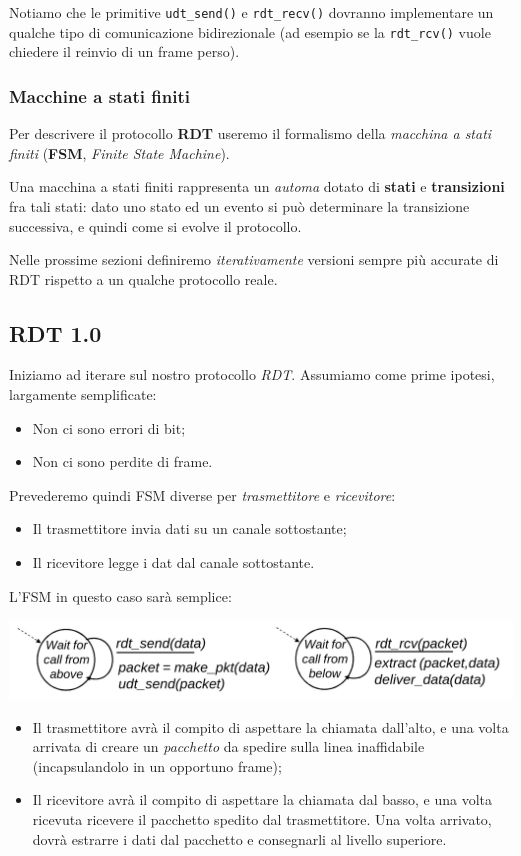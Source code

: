 \documentclass[a4paper,11pt]{article}
\begin{document}
Notiamo che le primitive \lstinline|udt_send()| e \lstinline|rdt_recv()| dovranno implementare un qualche tipo di comunicazione bidirezionale (ad esempio se la \lstinline|rdt_rcv()| vuole chiedere il reinvio di un frame perso).

\subsubsection{Macchine a stati finiti}
Per descrivere il protocollo \textbf{RDT} useremo il formalismo della \textit{macchina a stati finiti} (\textbf{FSM}, \textit{Finite State Machine}).

Una macchina a stati finiti rappresenta un \textit{automa} dotato di \textbf{stati} e \textbf{transizioni} fra tali stati: dato uno stato ed un evento si può determinare la transizione successiva, e quindi come si evolve il protocollo. 

\par\smallskip

Nelle prossime sezioni definiremo \textit{iterativamente} versioni sempre più accurate di RDT rispetto a un qualche protocollo reale.

\subsection{RDT 1.0}
Iniziamo ad iterare sul nostro protocollo \textit{RDT}.
Assumiamo come prime ipotesi, largamente semplificate:
\begin{itemize}
	\item Non ci sono errori di bit;
	\item Non ci sono perdite di frame.
\end{itemize}

Prevederemo quindi FSM diverse per \textit{trasmettitore} e \textit{ricevitore}:
\begin{itemize}
	\item Il trasmettitore invia dati su un canale sottostante;
	\item Il ricevitore legge i dat dal canale sottostante.
\end{itemize}

L'FSM in questo caso sarà semplice:
\begin{center}
	\includegraphics[scale=0.16]{../figures/rdt1fsm.png}
\end{center}
\begin{itemize}
	\item Il trasmettitore avrà il compito di aspettare la chiamata dall'alto, e una volta arrivata di creare un \textit{pacchetto} da spedire sulla linea inaffidabile (incapsulandolo in un opportuno frame);
	\item Il ricevitore avrà il compito di aspettare la chiamata dal basso, e una volta ricevuta ricevere il pacchetto spedito dal trasmettitore. Una volta arrivato, dovrà estrarre i dati dal pacchetto e consegnarli al livello superiore.
\end{itemize}
\end{document}
